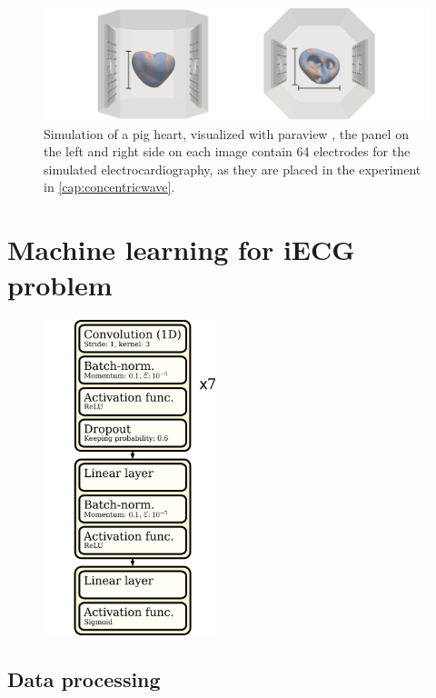 \begin{figure}[ht]
    \center
    \hspace*{-2.45cm} 
    \includegraphics[width=1.4\textwidth]{figures/simulation_setup.png}
	\caption{Simulation of a pig heart, visualized with paraview \cite{paraview}, the panel on the left and right side on each image contain 64 electrodes for the simulated electrocardiography, as they are placed in the experiment in \ref{cap:concentricwave}.}
	\label{fig:pig_heart_in_bath}
\end{figure}

\section{Machine learning for iECG problem}

\begin{figure}[ht]
    \center
    \hspace*{-2.45cm} 
    \includegraphics[width=5cm]{figures/ecg_cnn1d.png}
	\caption{}
	\label{fig:pig_heart_in_bath}
\end{figure}




\subsection{Data processing}\label{cap:processing}


